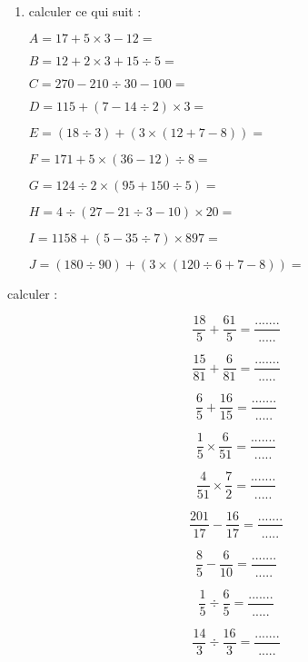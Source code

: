 \documentclass[a4paper,addpoints,12pt]{exam}
\begin{document}
\devoir[prv=false,ds=false,num=1 ,niv=1 ,date=12/10/2022,Rdate=19/10/2022]

\begin{exo}
\begin{multicols}{2}
\begin{enumerate}[font=\bfseries]
		\item calculer ce qui suit :
		
$ A=17+5\times 3-12=$

$ B=12+2\times 3+15\div 5=$

$ C=270-210\div 30-100=$

$ D=115+(7-14\div 2)\times 3=$

$ E=(18\div 3)+(3\times(12+7-8))=$
		
$ F=171+5\times( 36-12)\div 8=$

$ G=124\div 2\times( 95+150\div 5)=$

$ H=4\div(27-21\div 3-10)\times 20=$

$ I=1158+(5-35\div 7)\times 897=$

$ J=(180\div 90)+(3\times(120\div 6+7-8))=$
	\end{enumerate}
	\end{multicols}
	
\end{exo}

\begin{exo}
	\begin{questions}
		\question[5] calculer :
		\end{questions}
\begin{multicols}{2}		

\[\dfrac{18}{5}+\dfrac{61}{5}=\dfrac{.......}{.....}\]

\[\dfrac{15}{81}+\dfrac{6}{81}=\dfrac{.......}{.....}\]

\[\dfrac{6}{5}+\dfrac{16}{15}=\dfrac{.......}{.....}\]

\[\dfrac{1}{5}\times \dfrac{6}{51}=\dfrac{.......}{.....}\]

\[\dfrac{4}{51}\times\dfrac{7}{2}=\dfrac{.......}{.....}\]


\end{multicols}
\[\dfrac{201}{17}-\dfrac{16}{17}=\dfrac{.......}{.....}\]

\[\dfrac{8}{5}-\dfrac{6}{10}=\dfrac{.......}{.....}\]

\[\dfrac{1}{5}\div\dfrac{6}{5}=\dfrac{.......}{.....}\]

\[\dfrac{14}{3}\div\dfrac{16}{3}=\dfrac{.......}{.....}\]
		
	
	
\end{exo}
\end{document}
